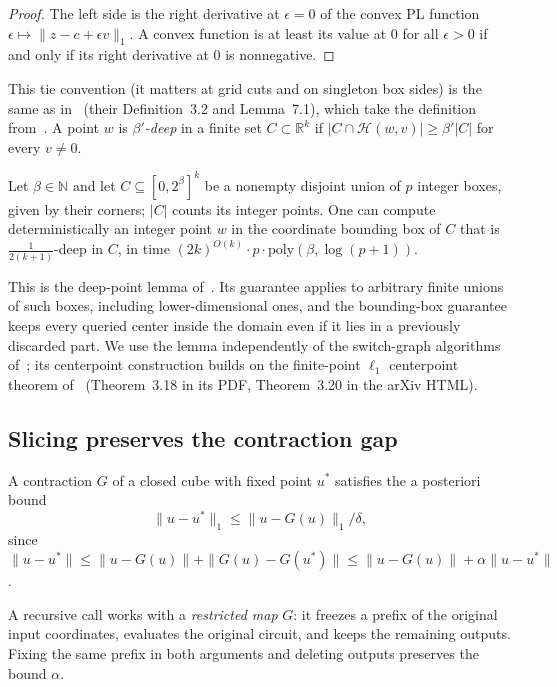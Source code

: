 \begin{proof}
The left side is the right derivative at $\epsilon=0$ of the convex PL function
$\epsilon\mapsto\|z-c+\epsilon v\|_1$. A convex function is at least its value at $0$ for all $\epsilon>0$
if and only if its right derivative at $0$ is nonnegative.
\end{proof}

This tie convention (it matters at grid cuts and on singleton box sides) is the same as
in~\cite{glm26} (their Definition~3.2 and Lemma~7.1), which take the definition from~\cite{hlsw25}. A
point $w$ is \emph{$\beta'$-deep} in a finite set $C\subset\mathbb R^k$ if
$|C\cap\mathcal H(w,v)|\ge\beta'|C|$ for every $v\ne0$.

\begin{lemma}\label{lem:sx-deep}
\statuscited
Let $\beta\in\mathbb N$ and let $C\subseteq[0,2^\beta]^k$ be a nonempty disjoint union of $p$ integer
boxes, given by their corners; $|C|$ counts its integer points. One can compute deterministically an
integer point $w$ in the coordinate bounding box of $C$ that is $\frac1{2(k+1)}$-deep in $C$, in time
$(2k)^{O(k)}\cdot p\cdot\mathrm{poly}(\beta,\log(p+1))$.
\end{lemma}

This is the deep-point lemma of~\cite[\S8.4]{glm26}. Its guarantee applies to arbitrary finite unions
of such boxes, including lower-dimensional ones, and the bounding-box guarantee keeps every queried
center inside the domain even if it lies in a previously discarded part. We use the lemma independently
of the switch-graph algorithms of~\cite{glm26}; its centerpoint construction builds on the finite-point $\ell_1$ centerpoint theorem of~\cite{hlsw25} (Theorem~3.18 in its PDF, Theorem~3.20 in the arXiv HTML).

\subsection{Slicing preserves the contraction gap}

A contraction $G$ of a closed cube with fixed point $u^*$ satisfies the a posteriori bound
\begin{equation}\label{eq:sx-apost}
  \|u-u^*\|_1\le\|u-G(u)\|_1/\delta,
\end{equation}
since $\|u-u^*\|\le\|u-G(u)\|+\|G(u)-G(u^*)\|\le\|u-G(u)\|+\alpha\|u-u^*\|$.

A recursive call works with a \emph{restricted map} $G$: it freezes a prefix of the original input
coordinates, evaluates the original circuit, and keeps the remaining outputs. Fixing the same prefix in
both arguments and deleting outputs preserves the bound $\alpha$.

